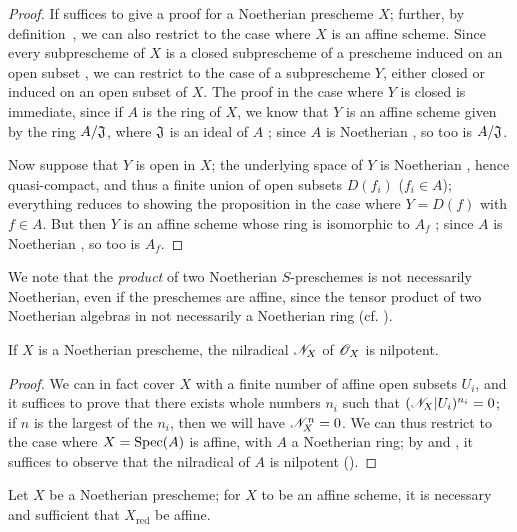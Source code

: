 \begin{proof}
\label{proof-1.6.1.4}
If suffices to give a proof for a Noetherian prescheme $X$;
further, by definition~, we can also restrict to the case where $X$ is an affine scheme.
Since every subprescheme of $X$ is a closed subprescheme of a prescheme induced on an open subset , we can restrict to the case of a subprescheme $Y$, either closed or induced on an open subset of $X$.
The proof in the case where $Y$ is closed is immediate, since if $A$ is the ring of $X$, we know that $Y$ is an affine scheme given by the ring $A/\mathfrak{J}$, where $\mathfrak{J}$ is an ideal of $A$ ;
since $A$ is Noetherian , so too is $A/\mathfrak{J}$.

Now suppose that $Y$ is open in $X$;
the underlying space of $Y$ is Noetherian , hence quasi-compact, and thus a finite union of open subsets $D(f_i)$ ($f_i\in A$);
everything reduces to showing the proposition in the case where $Y=D(f)$ with $f\in A$.
But then $Y$ is an affine scheme whose ring is isomorphic to $A_f$ ;
since $A$ is Noetherian , so too is $A_f$.
\end{proof}

\begin{env}[6.1.5]
\label{1.6.1.5}
We note that the \emph{product} of two Noetherian $S$-preschemes is not necessarily Noetherian, even if the preschemes are affine, since the tensor product of two Noetherian algebras in not necessarily a Noetherian ring (cf. ).
\end{env}

\begin{prop}[6.1.6]
\label{1.6.1.6}
If $X$ is a Noetherian prescheme, the nilradical $\mathscr{N}_X$ of $\mathscr{O}_X$ is nilpotent.
\end{prop}

\begin{proof}
\label{proof-1.6.1.6}
We can in fact cover $X$ with a finite number of affine open subsets $U_i$, and it suffices to prove that there exists whole numbers $n_i$ such that $(\mathscr{N}_X|U_i)^{n_i}=0$;
if $n$ is the largest of the $n_i$, then we will have $\mathscr{N}_X^n=0$.
We can thus restrict to the case where $X={\mathop{\mathrm{Spec}}\nolimits}(A)$ is affine, with $A$ a Noetherian ring;
by  and , it suffices to observe that the nilradical of $A$ is nilpotent (\cite[p.~127, cor.~4]{I-11}).
\end{proof}

\begin{cor}[6.1.7]
\label{1.6.1.7}
Let $X$ be a Noetherian prescheme;
for $X$ to be an affine scheme, it is necessary and sufficient that $X_\mathrm{red}$ be affine.
\end{cor}


